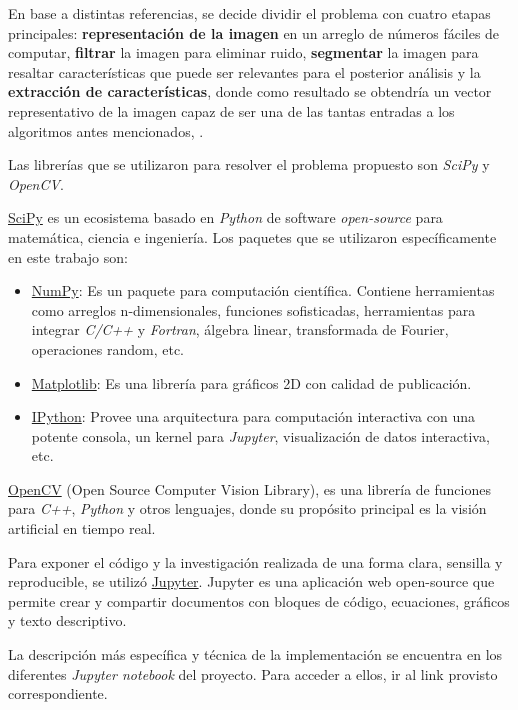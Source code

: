 \documentclass[10pt,a4paper]{article}
\begin{document}
En base a distintas referencias, se decide dividir el problema con cuatro etapas principales: \textbf{representación de la imagen} en un arreglo de números fáciles de computar, \textbf{filtrar} la imagen para eliminar ruido, \textbf{segmentar} la imagen para resaltar características que puede ser relevantes para el posterior análisis y la \textbf{extracción de características}, donde como resultado se obtendría un vector representativo de la imagen capaz de ser una de las tantas entradas a los algoritmos antes mencionados, \textcite{SciPy2018}.

Las librerías que se utilizaron para resolver el problema propuesto son \textit{SciPy} y \textit{OpenCV}.

\href{https://www.scipy.org/}{SciPy} es un ecosistema basado en \textit{Python} de software \textit{open-source} para matemática, ciencia e ingeniería. Los paquetes que se utilizaron específicamente en este trabajo son:

\begin{itemize}
\item \href{http://www.numpy.org/}{NumPy}: Es un paquete para computación científica. Contiene herramientas como arreglos n-dimensionales, funciones sofisticadas, herramientas para integrar \textit{C/C++} y \textit{Fortran}, álgebra linear, transformada de Fourier, operaciones random, etc.

\item \href{https://matplotlib.org/}{Matplotlib}: Es una librería para gráficos 2D con calidad de publicación.

\item \href{https://ipython.org/}{IPython}: Provee una arquitectura para computación interactiva con una potente consola, un kernel para \textit{Jupyter}, visualización de datos interactiva, etc.
\end{itemize}

\href{https://opencv.org/}{OpenCV} (Open Source Computer Vision Library), es una librería de funciones para \textit{C++}, \textit{Python} y otros lenguajes, donde su propósito principal es la visión artificial en tiempo real.

Para exponer el código y la investigación realizada de una forma clara, sensilla y reproducible, se utilizó \href{https://jupyter.org/}{Jupyter}. Jupyter es una aplicación web open-source que permite crear y compartir documentos con bloques de código, ecuaciones, gráficos y texto descriptivo.

La descripción más específica y técnica de la implementación se encuentra en los diferentes \textit{Jupyter notebook} del proyecto. Para acceder a ellos, ir al link provisto correspondiente.
\end{document}
